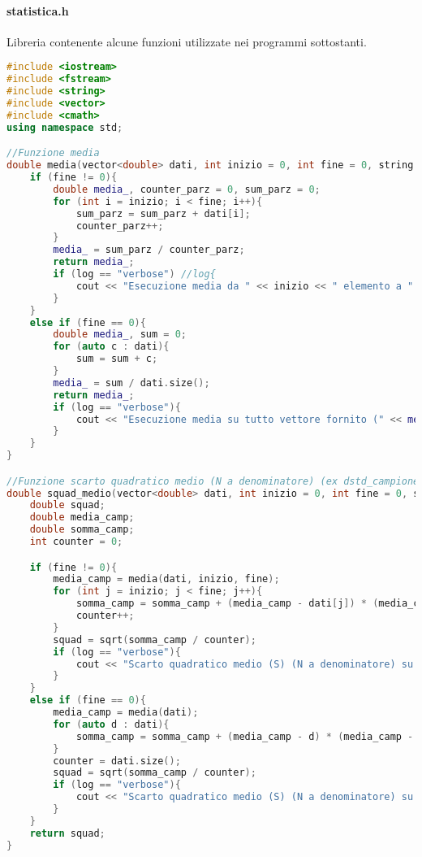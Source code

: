 \documentclass[a4paper,11pt,oneside]{article}
\begin{document}
\paragraph{statistica.h} Libreria contenente alcune funzioni utilizzate nei programmi sottostanti.
\begin{lstlisting}[language=C++, label=lst:statistica.h, caption=statistica.h]
#include <iostream>
#include <fstream>
#include <string>
#include <vector>
#include <cmath>
using namespace std;

//Funzione media
double media(vector<double> dati, int inizio = 0, int fine = 0, string log = ""){
    if (fine != 0){
        double media_, counter_parz = 0, sum_parz = 0;
        for (int i = inizio; i < fine; i++){
            sum_parz = sum_parz + dati[i];
            counter_parz++;
        }
        media_ = sum_parz / counter_parz;
        return media_;
        if (log == "verbose") //log{
            cout << "Esecuzione media da " << inizio << " elemento a " << fine << "su vettore fornito" << endl;
        }
    }
    else if (fine == 0){
        double media_, sum = 0;
        for (auto c : dati){
            sum = sum + c;
        }
        media_ = sum / dati.size();
        return media_;
        if (log == "verbose"){
            cout << "Esecuzione media su tutto vettore fornito (" << media_ << ")" << endl;
        }
    }
}

//Funzione scarto quadratico medio (N a denominatore) (ex dstd_campione)
double squad_medio(vector<double> dati, int inizio = 0, int fine = 0, string log = ""){
    double squad;
    double media_camp;
    double somma_camp;
    int counter = 0;

    if (fine != 0){
        media_camp = media(dati, inizio, fine);
        for (int j = inizio; j < fine; j++){
            somma_camp = somma_camp + (media_camp - dati[j]) * (media_camp - dati[j]);
            counter++;
        }
        squad = sqrt(somma_camp / counter);
        if (log == "verbose"){
            cout << "Scarto quadratico medio (S) (N a denominatore) su parte del vettore (" << squad << ")" << endl;
        }
    }
    else if (fine == 0){
        media_camp = media(dati);
        for (auto d : dati){
            somma_camp = somma_camp + (media_camp - d) * (media_camp - d);
        }
        counter = dati.size();
        squad = sqrt(somma_camp / counter);
        if (log == "verbose"){
            cout << "Scarto quadratico medio (S) (N a denominatore) su tutto il vettore (" << squad << ")" << endl;
        }
    }
    return squad;
}


\end{lstlisting}
\end{document}
